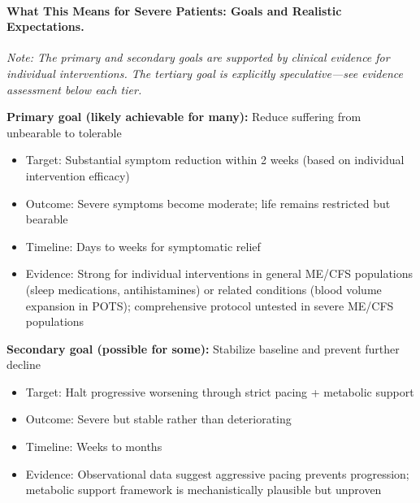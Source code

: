 \paragraph{What This Means for Severe Patients: Goals and Realistic Expectations.}

\begin{keypoint}

\textit{Note: The primary and secondary goals are supported by clinical evidence for individual interventions. The tertiary goal is explicitly speculative---see evidence assessment below each tier.}

\textbf{Primary goal (likely achievable for many):} Reduce suffering from unbearable to tolerable
\begin{itemize}
    \item Target: Substantial symptom reduction within 2 weeks (based on individual intervention efficacy)
    \item Outcome: Severe symptoms become moderate; life remains restricted but bearable
    \item Timeline: Days to weeks for symptomatic relief
    \item Evidence: Strong for individual interventions in general ME/CFS populations (sleep medications, antihistamines) or related conditions (blood volume expansion in POTS); comprehensive protocol untested in severe ME/CFS populations
\end{itemize}

\textbf{Secondary goal (possible for some):} Stabilize baseline and prevent further decline
\begin{itemize}
    \item Target: Halt progressive worsening through strict pacing + metabolic support
    \item Outcome: Severe but stable rather than deteriorating
    \item Timeline: Weeks to months
    \item Evidence: Observational data suggest aggressive pacing prevents progression; metabolic support framework is mechanistically plausible but unproven
\end{itemize}


\end{keypoint}
